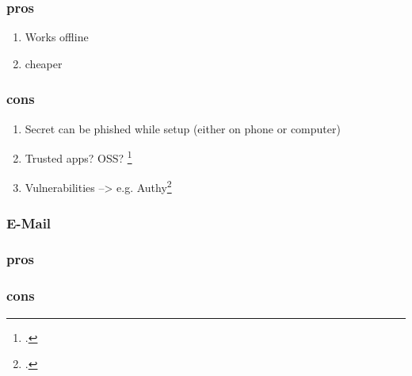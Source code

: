 \subsubsection{pros}

\begin{enumerate}
	\item Works offline
	\item cheaper
\end{enumerate}

\subsubsection{cons}

\begin{enumerate}
	\item Secret can be phished while setup (either on phone or computer)
	\item Trusted apps? OSS? \footcite{eset-bypass2fa}
	\item Vulnerabilities --> e.g. Authy\footcite{sakurity-authy}
\end{enumerate}

\subsubsection{E-Mail}

\subsubsection{pros}

\subsubsection{cons}
